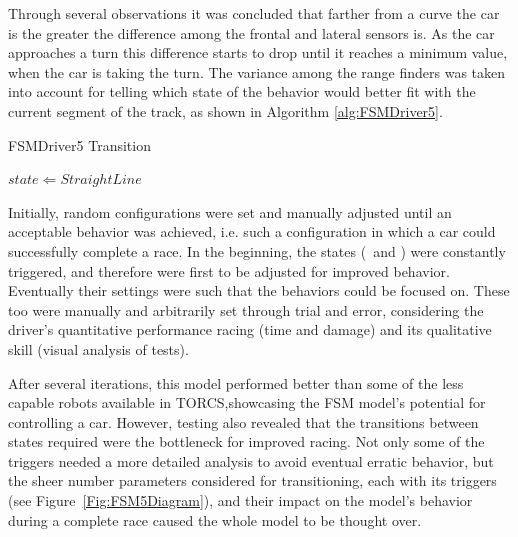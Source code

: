 Through several observations it was concluded that farther from a curve the car is the greater the difference among the frontal and lateral sensors is. As the car approaches a turn this difference starts to drop until it reaches a minimum value, when the car is taking the turn. The variance among the range finders was taken into account for telling which state of the  behavior would better fit with the current segment of the track, as shown in Algorithm \ref{alg:FSMDriver5}.

\begin{algorithm}[h]%
\caption{FSMDriver5 Transition}%
\label{alg:FSMDriver5}%
\begin{algorithmic}
   		\STATE $state \Leftarrow StraightLine$
   	\ENDIF
   	\ELSE \IF {}
\end{algorithmic}
\end{algorithm}

Initially, random configurations were set and manually adjusted until an acceptable behavior was achieved, i.e. such a configuration in which a car could successfully complete a race. In the beginning, the  states (\OT~and \St) were constantly triggered, and therefore were first to be adjusted for improved behavior. Eventually their settings were such that the  behaviors could be focused on. These too were manually and arbitrarily set through trial and error, considering the driver's quantitative performance racing (time and damage) and its qualitative skill (visual analysis of tests).

After several iterations, this model performed better than some of the less capable robots available in TORCS,showcasing the FSM model's potential for controlling a car. However, testing also revealed that the transitions between states required were the bottleneck for improved racing. Not only some of the triggers needed a more detailed analysis to avoid eventual erratic behavior, but the sheer number parameters considered for transitioning, each with its triggers (see Figure~\ref{Fig:FSM5Diagram}), and their impact on the model's behavior during a complete race caused the whole model to be thought over.

